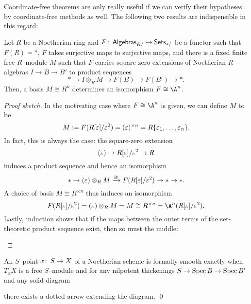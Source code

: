 Coordinate-free theorems are only really useful if we can verify their hypotheses by coordinate-free methods as well.  The following two results are indispensible in this regard:
\begin{theorem}\label{DetectingFormalVarieties}
Let $R$ be a Noetherian ring and $F\colon\thinspace \mathsf{Algebras}_{R/} \to \mathsf{Sets}_{*/}$ be a functor such that $F(R) = *$, $F$ takes surjective maps to surjective maps, and there is a fixed finite free $R$--module $M$ such that $F$ carries square-zero extensions of Noetherian $R$--algebras $I \to B \to B'$ to product sequences \[* \to I \otimes_R M \to F(B) \to F(B') \to *.\]  Then, a basis $M \cong R^n$ determines an isomorphism $F \cong \A^n$.
\end{theorem}
\begin{proof}[Proof sketch]
In the motivating case where $F \cong \A^n$ is given, we can define $M$ to be \[M := F(R[\varepsilon] / \varepsilon^2) = (\varepsilon)^{\times n} = R\{\varepsilon_1, \ldots, \varepsilon_n\}.\]  In fact, this is always the case: the square-zero extension \[(\varepsilon) \to R[\varepsilon] / \varepsilon^2 \to R\] induces a product sequence and hence an isomorphism \[* \to (\varepsilon) \otimes_R M \xrightarrow{\cong} F(R[\varepsilon] / \varepsilon^2) \to * \to *.\]  A choice of basis $M \cong R^{\times n}$ thus induces an isomorphism \[F(R[\eps] / \eps^2) = (\eps) \otimes_R M = M \cong R^{\times n} = \A^n(R[\eps] / \eps^2).\]  Lastly, induction shows that if the maps between the outer terms of the set-theoretic product sequence exist, then so must the middle:
\begin{center}
\end{center}
\vspace{-\baselineskip}
\end{proof}

\begin{corollary}
An $S$--point $x\colon\thinspace S \to X$ of a Noetherian scheme is formally smooth exactly when $T_x X$ is a free $S$--module and for any nilpotent thickenings $S \to \operatorname{Spec} B \to \operatorname{Spec} B'$ and any solid diagram
\begin{center}
\end{center}
there exists a dotted arrow extending the diagram. \qed
\end{corollary}

